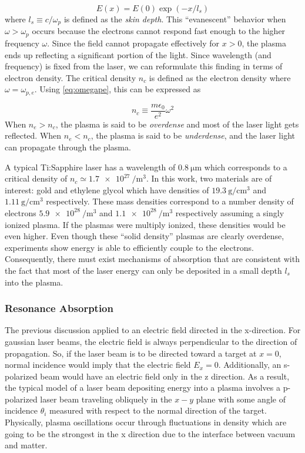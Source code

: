 \begin{equation}
	E(x) = E(0) \exp(-x / l_s)
\end{equation}
where $l_s \equiv c / \omega_p$ is defined as the \emph{skin depth}. This ``evanescent'' behavior when $\omega > \omega_p$ occurs because the electrons cannot respond fast enough to the higher frequency $\omega$. Since the field cannot propagate effectively for $x > 0$, the plasma ends up reflecting a significant portion of the light. Since wavelength (and frequency) is fixed from the laser, we can reformulate this finding in terms of electron density. The critical density $n_c$ is defined as the electron density where $\omega = \omega_{p,e}$. Using \cref{eq:omegape}, this can be expressed as

\begin{equation}
	n_c \equiv \frac{m \epsilon_0}{e^2} \omega^2 \label{eq:criticaldensity}
\end{equation}
When $n_e > n_c$, the plasma is said to be \emph{overdense} and most of the laser light gets reflected. When $n_e < n_c$, the plasma is said to be \emph{underdense}, and the laser light can propagate through the plasma. 

A typical Ti:Sapphire laser has a wavelength of $\SI{0.8}{\micro \meter}$ which corresponds to a critical density of $n_c \simeq \SI{1.7e27}{\per \meter \cubed}$. In this work, two materials are of interest: gold and ethylene glycol which have densities of $\SI{19.3}{\gram \per \centi \meter \cubed}$ and $\SI{1.11}{\gram \per \centi \meter \cubed}$ respectively. These mass densities correspond to a number density of electrons $\SI{5.9e28}{\per \meter \cubed}$ and $\SI{1.1e28}{\per \meter \cubed}$ respectively assuming a singly ionized plasma. If the plasmas were multiply ionized, these densities would be even higher. Even though these ``solid density'' plasmas are clearly overdense, experiments show energy is able to efficiently couple to the electrons. Consequently, there must exist mechanisms of absorption that are consistent with the fact that most of the laser energy can only be deposited in a small depth $l_s$ into the plasma. 

\subsubsection{Resonance Absorption}
The previous discussion applied to an electric field directed in the x-direction. For gaussian laser beams, the electric field is always perpendicular to the direction of propagation. So, if the laser beam is to be directed toward a target at $x = 0$, normal incidence would imply that the electric field $E_x = 0$. Additionally, an s-polarized beam would have an electric field only in the z direction. As a result, the typical model of a laser beam depositing energy into a plasma involves a p-polarized laser beam traveling obliquely in the $x-y$ plane with some angle of incidence $\theta_i$ measured with respect to the normal direction of the target. Physically, plasma oscillations occur through fluctuations in density which are going to be the strongest in the x direction due to the interface between vacuum and matter.

